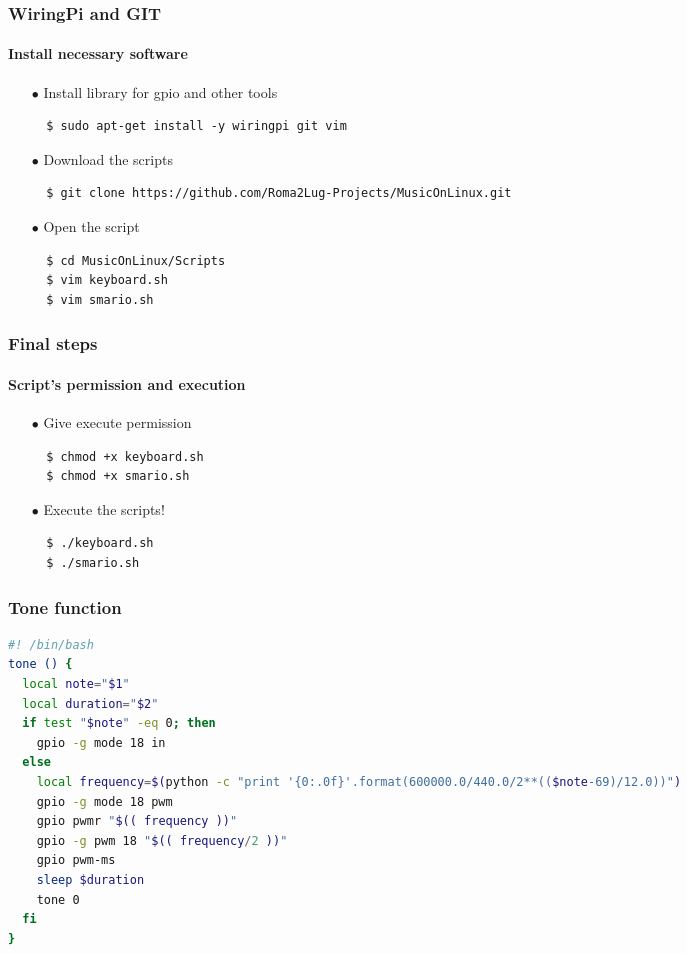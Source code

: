 \documentclass{beamer}
\begin{document}

\begin{frame}[fragile]
	\frametitle{\textbf{WiringPi and GIT}}
	\framesubtitle{\textbf{Install necessary software}}
		\begin{itemize}
			\item[$\bullet$] Install library for gpio and other tools
			\begin{lstlisting}
  $ sudo apt-get install -y wiringpi git vim
			\end{lstlisting}
			\item[$\bullet$] Download the scripts
			\begin{lstlisting}
  $ git clone https://github.com/Roma2Lug-Projects/MusicOnLinux.git
			\end{lstlisting}
			\item[$\bullet$] Open the script
			\begin{lstlisting}
  $ cd MusicOnLinux/Scripts
  $ vim keyboard.sh
  $ vim smario.sh
			\end{lstlisting}
		\end{itemize}
\end{frame}


\begin{frame}[fragile]
	\frametitle{\textbf{Final steps}}
	\framesubtitle{\textbf{Script's permission and execution}}

		\begin{itemize}
			\item[$\bullet$] Give execute permission
			\begin{lstlisting}
  $ chmod +x keyboard.sh
  $ chmod +x smario.sh
			\end{lstlisting}
			\item[$\bullet$] Execute the scripts!
			\begin{lstlisting}
  $ ./keyboard.sh
  $ ./smario.sh
			\end{lstlisting}
		\end{itemize}
\end{frame}



\begin{frame}[fragile]
	\frametitle{\textbf{Tone function}}
			\begin{lstlisting}[language=bash]
#! /bin/bash
tone () {
  local note="$1"
  local duration="$2"
  if test "$note" -eq 0; then
    gpio -g mode 18 in
  else
    local frequency=$(python -c "print '{0:.0f}'.format(600000.0/440.0/2**(($note-69)/12.0))")
    gpio -g mode 18 pwm
    gpio pwmr "$(( frequency ))"
    gpio -g pwm 18 "$(( frequency/2 ))"
    gpio pwm-ms
    sleep $duration
    tone 0
  fi
}

			\end{lstlisting}
\end{frame}
\end{document}
